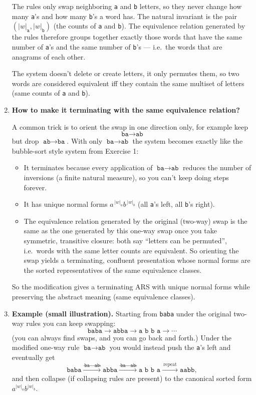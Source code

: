 \documentclass[12pt]{article}
\begin{document}
\begin{enumerate}[label=(\alph*)]
  The rules only swap neighboring \texttt{a} and \texttt{b} letters, so they never change how many \texttt{a}'s and how many \texttt{b}'s a word has. The natural invariant is the pair \((|w|_{\texttt{a}},|w|_{\texttt{b}})\) (the counts of \texttt{a} and \texttt{b}). The equivalence relation generated by the rules therefore groups together exactly those words that have the same number of \texttt{a}'s and the same number of \texttt{b}'s — i.e.\ the words that are anagrams of each other.  

 The system doesn't delete or create letters, it only permutes them, so two words are considered equivalent iff they contain the same multiset of letters (same counts of \texttt{a} and \texttt{b}).
  
  \item \textbf{How to make it terminating with the same equivalence relation?}
  
  A common trick is to orient the swap in one direction only, for example keep
  \[
    \texttt{ba}\to\texttt{ab}
  \]
  but drop \(\texttt{ab}\to\texttt{ba}\). With only \(\texttt{ba}\to\texttt{ab}\) the system becomes exactly like the bubble-sort style system from Exercise 1:
  \begin{itemize}
    \item It terminates because every application of \(\texttt{ba}\to\texttt{ab}\) reduces the number of inversions (a finite natural measure), so you can't keep doing steps forever.
    \item It has unique normal forms \(a^{\,|w|_a} b^{\,|w|_b}\) (all \texttt{a}'s left, all \texttt{b}'s right).
    \item The equivalence relation generated by the original (two-way) swap is the same as the one generated by this one-way swap once you take symmetric, transitive closure: both say “letters can be permuted”, i.e.\ words with the same letter counts are equivalent. So orienting the swap yields a terminating, confluent presentation whose normal forms are the sorted representatives of the same equivalence classes.
  \end{itemize}
  So the modification gives a terminating ARS with unique normal forms while preserving the abstract meaning (same equivalence classes).
  
  \item \textbf{Example (small illustration).} Starting from \texttt{baba} under the original two-way rules you can keep swapping:
  \[
    \texttt{baba}\longrightarrow\texttt{abba}\longrightarrow\texttt{a b b a}\longrightarrow\cdots
  \]
  (you can always find swaps, and you can go back and forth.) Under the modified one-way rule \(\texttt{ba}\to\texttt{ab}\) you would instead push the \texttt{a}'s left and eventually get
  \[
    \texttt{baba}\xrightarrow{\ \texttt{ba}\to\texttt{ab}\ } \texttt{abba}
    \xrightarrow{\ \texttt{ba}\to\texttt{ab}\ } \texttt{a b b a}\xrightarrow{\ \text{repeat}\ } \texttt{aabb},
  \]
  and then collapse (if collapsing rules are present) to the canonical sorted form \(a^{|w|_a}b^{|w|_b}\).
\end{enumerate}
\end{document}
